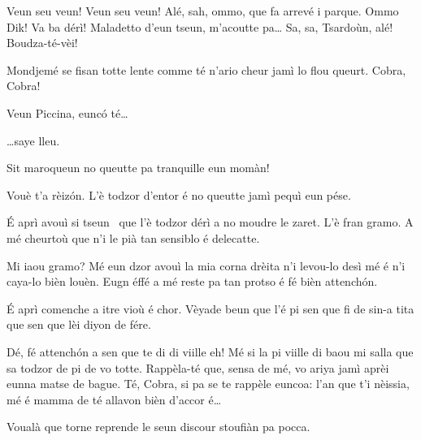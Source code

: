 \begin{drama}

\Sahlammspeaks Veun seu veun! Veun seu veun! Alé, sah, ommo, que fa arrevé i parque. Ommo Dik! Va ba dérì! Maladetto d'eun tseun, m'acoutte pa\ldots 
Sa, sa, Tsardoùn, alé! Boudza-té-vèi!


\Sahlammspeaks Mondjemé se fisan totte lente comme té n’ario cheur jamì lo flou queurt. Cobra, Cobra!


\Sahlammspeaks Veun Piccina, eunc\'o té\ldots


\Sahlammspeaks \ldots saye lleu.


\Piccinaspeaks Sit maroqueun no queutte pa tranquille eun momàn!

\Cobraspeaks  Vouè t’a rèiz\'on. L’è todzor d’entor é no queutte jamì pequì eun pése.

\Tzardounspeaks \'E aprì avouì si tseun \cane\ que l’è todzor dérì a no moudre le zaret. L’è fran gramo. A mé cheurtoù que n’i le pià tan sensiblo é delecatte.

\Cobraspeaks Mi iaou gramo? Mé eun dzor avouì la mia corna drèita n’i levou-lo desì mé é n'i caya-lo bièn louèn.  Eugn éffé a mé reste pa tan protso é fé bièn attench\'on.

\Piccinaspeaks \'E aprì comenche a itre vioù é chor. Vèyade beun que l’é pi sen que fi de sin-a tita que sen que lèi diyon de fére.

\Tzardounspeaks Dé, fé attench\'on a sen que te di di viille eh! Mé si la pi viille di baou mi salla que sa todzor de pi de vo totte. Rappèla-té que, sensa de mé, vo ariya jamì aprèi eunna matse de bague. Té, Cobra, si pa se te rappèle euncoa: l’an que t’i nèissia, mé é mamma de té allavon bièn d’accor é\ldots

\Cobraspeaks Voualà que torne reprende le seun discour stoufiàn pa pocca.


\end{drama}
